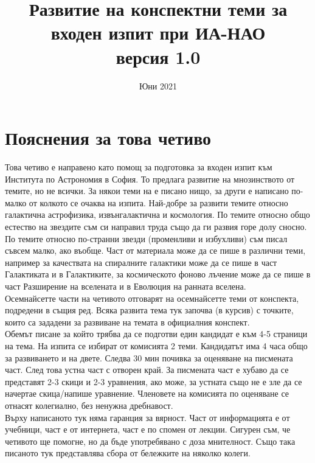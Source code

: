\documentclass[a4paper,12pt]{article}
\title{Развитие на конспектни теми за входен изпит при ИА-НАО\\
версия 1.0}
\date{Юни 2021}
\begin{document}
\maketitle

\tableofcontents

\section*{Пояснения за това четиво}

Това четиво е направено като помощ за подготовка за входен изпит към Института по Астрономия в София. То предлага развитие на мнозинството от темите, но не всички. За някои теми на е писано нищо, за други е написано по-малко от колкото се очаква на изпита. Най-добре за развити темите относно галактична астрофизика, извънгалактична и космология. По темите относно общо естество на звездите съм си направил труда също да ги развия горе долу сносно. По темите относно по-странни звезди (променливи и избухливи) съм писал съвсем малко, ако въобще. Част от материала може да се пише в различни теми, например за качествата на спиралните галактики може да се пише в част Галактиката и в Галактиките, за космическото фоново лъчение може да се пише в част Разширение на вселената и в Еволюция на ранната вселена.\\

Осемнайсетте части на четивото отговарят на осемнайсетте теми от конспекта, подредени в същия ред. Всяка развита тема тук започва (в курсив) с точките, които са зададени за развиване на темата в официалния конспект.\\

Обемът писане за който трябва да се подготви един кандидат е към 4-5 страници на тема. На изпита се избират от комисията 2 теми. Кандидатът има 4 часа общо за развиването и на двете. Следва 30 мин почивка за оценяване на писмената част. След това устна част с отворен край. За писмената част е хубаво да се представят 2-3 скици и 2-3 уравнения, ако може, за устната също не е зле да се начертае скица/напише уравнение. Членовете на комисията по оценяване се отнасят колегиално, без ненужна дребнавост.\\

Върху написаното тук няма гаранция за вярност. Част от информацията е от учебници, част е от интернета, част е по спомен от лекции. Сигурен съм, че четивото ще помогне, но да бъде употребявано с доза мнителност. Също така писаното тук представлява сбора от бележките на няколко колеги.\\
\end{document}
